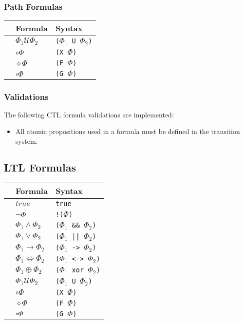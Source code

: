 \documentclass[11pt]{article}
\begin{document}
\subsubsection{Path Formulas}

\begin{tabular}{l|ll}
  & Formula & Syntax \\
  \hline
  & $\Phi_1 \mathcal{U} \Phi_2$ & \verb|(|$\Phi_1$\verb| U |$\Phi_2$\verb|)| \\
  & $\circ \Phi$ & \verb|(X |$\Phi$\verb|)| \\
  & $\diamond \Phi$ & \verb|(F |$\Phi$\verb|)| \\
  & $\square \Phi$ & \verb|(G |$\Phi$\verb|)| \\
\end{tabular}

\subsubsection{Validations}

The following CTL formula validations are implemented:

\begin{itemize}
  \item All atomic propositions used in a formula must be defined in the transition system.
\end{itemize}

\subsection{LTL Formulas}

\begin{tabular}{l|ll}
  & Formula & Syntax \\
  \hline
  & $true$ & \verb|true| \\
  & $\neg\Phi$ & \verb|!(|$\Phi$\verb|)| \\
  & $\Phi_1 \wedge \Phi_2$ & \verb|(|$\Phi_1$\verb| && |$\Phi_2$\verb|)| \\
  & $\Phi_1 \vee \Phi_2$ & \verb|(|$\Phi_1$\verb[ || [$\Phi_2$\verb|)| \\
  & $\Phi_1 \rightarrow \Phi_2$ & \verb|(|$\Phi_1$\verb| -> |$\Phi_2$\verb|)| \\
  & $\Phi_1 \iff \Phi_2$ & \verb|(|$\Phi_1$\verb| <-> |$\Phi_2$\verb|)| \\
  & $\Phi_1 \oplus \Phi_2$ & \verb|(|$\Phi_1$\verb| xor |$\Phi_2$\verb|)| \\
  & $\Phi_1 \mathcal{U} \Phi_2$ & \verb|(|$\Phi_1$\verb| U |$\Phi_2$\verb|)| \\
  & $\circ \Phi$ & \verb|(X |$\Phi$\verb|)| \\
  & $\diamond \Phi$ & \verb|(F |$\Phi$\verb|)| \\
  & $\square \Phi$ & \verb|(G |$\Phi$\verb|)| \\
\end{tabular}
\end{document}
